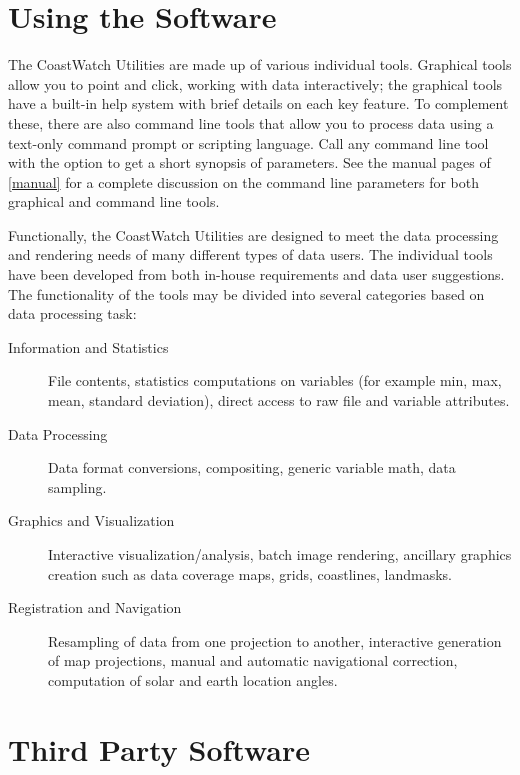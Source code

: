 \section{Using the Software}

The CoastWatch Utilities are made up of various individual tools.
Graphical tools allow you to point and click, working with data
interactively; the graphical tools have a built-in help system
with brief details on each key feature.  To complement these,
there are also command line tools that allow you to process data
using a text-only command prompt or scripting language.  Call any
command line tool with the  option to get a
short synopsis of parameters.  See the manual pages of
\autoref{manual} for a complete discussion on the command line
parameters for both graphical and command line tools.

Functionally, the CoastWatch Utilities are designed to meet the data
processing and rendering needs of many different types of data users.
The individual tools have been developed from both in-house
requirements and data user suggestions.  The functionality of the
tools may be divided into several categories based on data processing
task:
\begin{description}

  \item[Information and Statistics] File contents, statistics
  computations on variables (for example min, max, mean, standard
  deviation), direct access to raw file and variable attributes.

  \item[Data Processing] Data format conversions,
  compositing, generic variable math, data sampling.

  \item[Graphics and Visualization] Interactive
  visualization/analysis, batch image rendering, ancillary graphics
  creation such as data coverage maps, grids, coastlines, landmasks.
    
  \item[Registration and Navigation] Resampling of data from one
  projection to another, interactive generation of map projections,
  manual and automatic navigational correction, computation of solar
  and earth location angles.

\end{description}

\section{Third Party Software}
\label{third}

